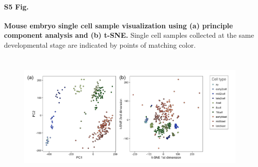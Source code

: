 \documentclass[10pt,letterpaper]{article}
\begin{document}
\paragraph*{S5 Fig.}

\label{figS5}
{\bf Mouse embryo single cell sample visualization using (a) principle component analysis and (b) t-SNE.}
Single cell samples collected at the same developmental stage are indicated by points of matching color.
\begin{figure}[ht]
\centering
\includegraphics[height=2.5in, width=6.5in]{../../src/figure/deng-pca-vs-tsne.Rmd/deng-with-legend.png}
\end{figure}
\end{document}
